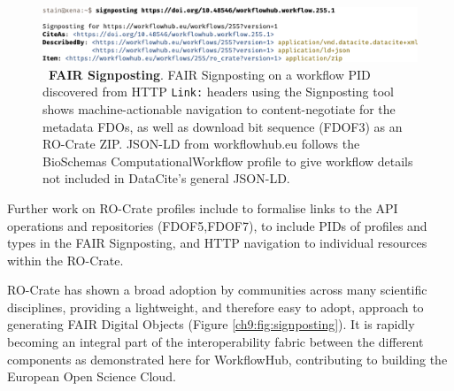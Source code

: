 \begin{figure}
  \centering
  \includegraphics[width=\textwidth]{figures/ch04/signposting.pdf}
  \caption[FAIR Signposting]{~\textbf{FAIR Signposting}.
  FAIR Signposting on a workflow PID \cite{Bayarri 2022} 
  discovered from HTTP \texttt{Link:} headers using the
  Signposting tool\footnotemark{} shows
  machine-actionable navigation to content-negotiate for the metadata
  FDOs, as well as download bit sequence (FDOF3) as an RO-Crate ZIP.
  JSON-LD\footnotemark{} from
  workflowhub.eu follows the BioSchemas
  ComputationalWorkflow
  profile\footnotemark{}
  to give workflow details not included in DataCite's general 
  JSON-LD\footnotemark.
  }
  \label{fig:signposting}
\end{figure} 
\addtocounter{footnote}{-4}
\addtocounter{footnote}{1}
\addtocounter{footnote}{1}
\addtocounter{footnote}{1}
\addtocounter{footnote}{1}

Further work on RO-Crate profiles include to formalise links to the API
operations and repositories (FDOF5,FDOF7), to include PIDs of
profiles and types in the FAIR Signposting, and HTTP navigation to
individual resources within the RO-Crate.

RO-Crate has shown a broad adoption by communities across many
scientific disciplines, providing a lightweight, and therefore easy to
adopt, approach to generating FAIR Digital Objects (Figure \vref{ch9:fig:signposting}). It is rapidly
becoming an integral part of the interoperability fabric between the
different components as demonstrated here for WorkflowHub, contributing
to building the European Open Science Cloud.


